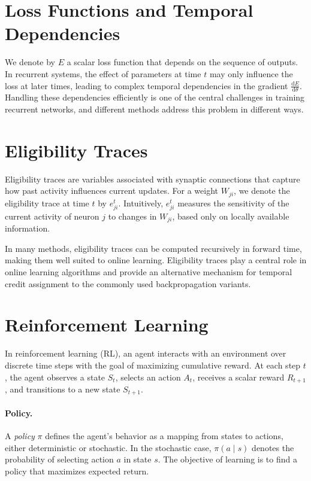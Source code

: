 \section{Loss Functions and Temporal Dependencies}

We denote by $E$ a scalar loss function that depends on the sequence of
outputs. In recurrent systems, the effect of parameters at time $t$ may only
influence the loss at later times, leading to complex temporal dependencies
in the gradient $\frac{\mathrm{d}E}{\mathrm{d}\theta}$. Handling these 
dependencies efficiently is one of the central challenges in
training recurrent networks, and different methods address this problem in
different ways.

\section{Eligibility Traces}

Eligibility traces are variables associated with synaptic connections that
capture how past activity influences current updates. For a weight $W_{ji}$,
we denote the eligibility trace at time $t$ by $e^t_{ji}$. Intuitively, 
$e^t_{ji}$ measures the sensitivity of the current activity of
neuron $j$ to changes in $W_{ji}$, based only on locally available
information. 

In many methods, eligibility traces can be computed recursively
in forward time, making them well suited to online learning. Eligibility 
traces play a central role in online learning algorithms and provide an 
alternative mechanism for temporal credit assignment to the commonly used 
backpropagation variants.

\section{Reinforcement Learning}

In reinforcement learning (RL), an agent interacts with an environment over
discrete time steps with the goal of maximizing cumulative reward. At each
step $t$, the agent observes a state $S_t$, selects an action $A_t$, receives
a scalar reward $R_{t+1}$, and transitions to a new state $S_{t+1}$.

\paragraph{Policy.}
A \emph{policy} $\pi$ defines the agent's behavior as a mapping from states
to actions, either deterministic or stochastic. In the stochastic case,
$\pi(a \mid s)$ denotes the probability of selecting action $a$ in state $s$.
The objective of learning is to find a policy that maximizes expected return.

